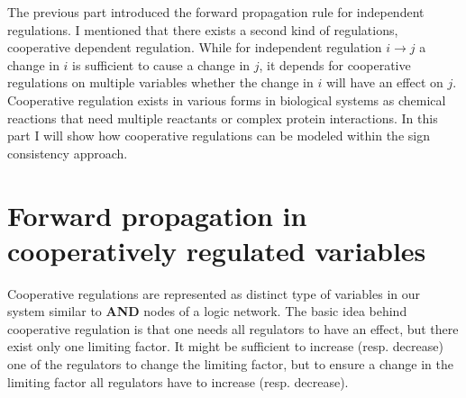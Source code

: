 The previous part introduced the forward propagation rule for independent regulations.
I mentioned that there exists a second kind of regulations, cooperative dependent regulation.
While for independent regulation $i \rightarrow j$  a change in $i$ is sufficient to cause a change in $j$,
it depends for cooperative regulations on multiple variables whether the change in $i$ will have an effect on $j$.
Cooperative regulation exists in various forms in biological systems as chemical reactions that need multiple reactants or complex protein interactions.
In this part I will show how cooperative regulations can be modeled within the sign consistency approach.


\section*{Forward propagation in cooperatively regulated variables}

Cooperative regulations are represented as distinct type of variables in our system
 similar to {\bf AND} nodes of a logic network.
The basic idea behind cooperative regulation is that one needs all regulators to have an effect, 
 but there exist only one limiting factor.
It might be sufficient to increase (resp. decrease) one of the regulators to change the limiting factor, but
to ensure a change in the limiting factor all regulators have to increase (resp. decrease).

